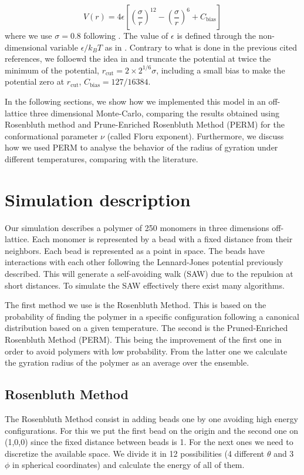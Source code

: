 \documentclass[aps,prl,reprint,groupedaddress]{revtex4-1}
\begin{document}
\begin{equation}
	V(r) = 4 \epsilon \left[\left(\frac{\sigma}{r} \right)^{12} - \left(\frac{\sigma}{r} \right)^{6} + C_{\text{bias}}\right]
\end{equation}
where we use $\sigma = 0.8$ following \cite{Yong1996, ICCPBook}. The value of $\epsilon$ is defined through the non-dimensional variable $\epsilon/k_B T$ as in \cite{Grassberger1997, Yong1996}. Contrary to what is done in the previous cited references, we folloewd the idea in \cite{mc_polymer_review} and truncate the potential at twice the minimum of the potential, $r_{\text{cut}} = 2 \times 2^{1/6} \sigma$, including a small bias to make the potential zero at $r_{\text{cut}}$, $C_{\text{bias}} = 127/16384$.

In the following sections, we show how we implemented this model in an off-lattice three dimensional Monte-Carlo, comparing the results obtained using Rosenbluth method and Prune-Enriched Rosenbluth Method (PERM) for the conformational parameter $\nu$ (called Floru exponent). Furthermore, we discuss how we used PERM to analyse the behavior of the radius of gyration under different temperatures, comparing with the literature.

\section{Simulation description \label{description}}
Our simulation describes a polymer of 250 monomers in three dimensions off-lattice. Each monomer is represented by a bead with a fixed distance from their neighbors. Each bead is represented as a point in space. The beads have interactions with each other following the Lennard-Jones potential previously described. This will generate a self-avoiding walk (SAW) due to the repulsion at short distances. To simulate the SAW effectively there exist many algorithms. 

The first method we use is the Rosenbluth Method. This is based on the probability of finding the polymer in a specific configuration following a canonical distribution based on a given temperature.  The second is the Pruned-Enriched Rosenbluth Method (PERM). This being the improvement of the first one in order to avoid polymers with low probability. From the latter one we calculate the gyration radius of the polymer as an average over the ensemble.

\subsection{Rosenbluth Method}
The Rosenbluth Method consist in adding beads one by one avoiding high energy configurations. For this we put the first bead on the origin and the second one on (1,0,0) since the fixed distance between beads is 1. For the next ones we need to discretize the available space. We divide it in 12 possibilities (4 different $\theta$ and 3 $\phi$ in spherical coordinates) and calculate the energy of all of them. 
\end{document}
